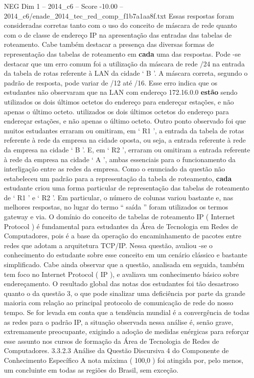 \begin{textsample}{NEG Dim 1 – 2014\_c6 – Score -10.00 – 2014\_c6/enade\_2014\_tec\_red\_comp\_f1b7a1aa8f.txt}
Essas respostas foram consideradas corretas tanto com o uso do conceito de máscara de rede quanto com o de classe de endereço IP na apresentação das entradas das tabelas de roteamento.
Cabe também destacar a presença das diversas formas de representação das tabelas de roteamento em \textbf{cada} uma das respostas.
Pode -se destacar que um erro comum foi a utilização da máscara de rede /24 na entrada da tabela de rotas referente à LAN da cidade ‘ B ’.
A máscara correta, segundo o padrão de resposta, pode variar de /12 até /16.
Esse erro indica que os estudantes não observaram que na LAN com endereço 172.16.0.0 \textbf{estão} sendo utilizados os dois últimos octetos do endereço para endereçar estações, e não apenas o último octeto. utilizados os dois últimos octetos do endereço para endereçar estações, e não apenas o último octeto.
Outro ponto observado foi que muitos estudantes erraram ou omitiram, em ‘ R1 ’, a entrada da tabela de rotas referente à rede da empresa na cidade oposta, ou seja, a entrada referente à rede da empresa na cidade ‘ B ’.
E, em ‘ R2 ’, erraram ou omitiram a entrada referente à rede da empresa na cidade ‘ A ’, ambas essenciais para o funcionamento da interligação entre as redes da empresa.
Como o enunciado da questão não estabeleceu um padrão para a representação da tabela de roteamento, \textbf{cada} estudante criou uma forma particular de representação das tabelas de roteamento de ‘ R1 ’ e ‘ R2 ’.
Em particular, o número de colunas variou bastante e, nas melhores respostas, no lugar do termo “ saída ” foram utilizados os termos gateway e via.
O domínio do conceito de tabelas de roteamento IP ( Internet Protocol ) é fundamental para estudantes da Área de Tecnologia em Redes de Computadores, pois é a base da operação do encaminhamento de pacotes entre redes que adotam a arquitetura TCP/IP.
Nessa questão, avaliou -se o conhecimento do estudante sobre esse conceito em um cenário clássico e bastante simplificado.
Cabe ainda observar que a questão, analisada em seguida, também tem foco no Internet Protocol ( IP ), e avaliava um conhecimento básico sobre endereçamento.
O resultado global das notas dos estudantes foi tão desastroso quanto o da questão 3, o que pode sinalizar uma deficiência por parte da grande maioria com relação ao principal protocolo de comunicação de rede do nosso tempo.
Se for levada em conta que a tendência mundial é a convergência de todas as redes para o padrão IP, a situação observada nessa análise é, senão grave, extremamente preocupante, exigindo a adoção de medidas enérgicas para reforçar esse assunto nos cursos de formação da Área de Tecnologia de Redes de Computadores. 3.3.2.3 Análise da Questão Discursiva 4 do Componente de Conhecimento Específico A nota máxima ( 100,0 ) foi atingida por, pelo menos, um concluinte em todas as regiões do Brasil, sem exceção.

\end{textsample}
